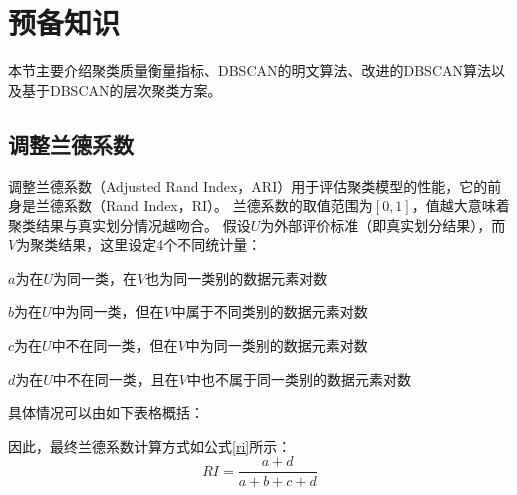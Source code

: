 \section{预备知识}
\label{s4-yubei}
本节主要介绍聚类质量衡量指标、DBSCAN的明文算法、改进的DBSCAN算法以及基于DBSCAN的层次聚类方案。

\subsection{调整兰德系数}
\label{s4-ari-intro}
调整兰德系数（Adjusted Rand Index，ARI）\cite{hubert1985comparing}用于评估聚类模型的性能，它的前身是兰德系数（Rand Index，RI）。
兰德系数的取值范围为$ [0,1] $，值越大意味着聚类结果与真实划分情况越吻合。
假设$ U $为外部评价标准（即真实划分结果），而$ V $为聚类结果，这里设定4个不同统计量：
\begin{compactitem}
	\item $ a $为在$ U $为同一类，在$ V $也为同一类别的数据元素对数
	\item $ b $为在$ U $中为同一类，但在$ V $中属于不同类别的数据元素对数
	\item $ c $为在$ U $中不在同一类，但在$ V $中为同一类别的数据元素对数
	\item $ d $为在$ U $中不在同一类，且在$ V $中也不属于同一类别的数据元素对数
\end{compactitem}

具体情况可以由如下表格概括：

\begin{table}[htbp]
	\centering
	\renewcommand{\arraystretch}{1.3}
	\caption{RI指标计算参数解释}
	\label{s4-table-dataset}
\end{table}

因此，最终兰德系数计算方式如公式\ref{ri}所示：
\begin{equation}
	R I=\frac{a+d}{a+b+c+d}
	\label{ri}
\end{equation}

